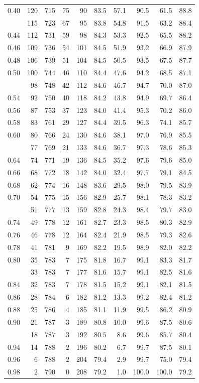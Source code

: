 \documentclass[
  11pt,
  letterpaper,
]{scrbook}
\theoremstyle{definition}
\theoremstyle{remark}
\begin{document}
\begin{longtable}{rrrrrrrrrr}
0.40 & 120 & 715 & 75 & 90 & 83.5 & 57.1 & 90.5 & 61.5 & 88.8\\
\addlinespace
0.42 & 115 & 723 & 67 & 95 & 83.8 & 54.8 & 91.5 & 63.2 & 88.4\\
0.44 & 112 & 731 & 59 & 98 & 84.3 & 53.3 & 92.5 & 65.5 & 88.2\\
0.46 & 109 & 736 & 54 & 101 & 84.5 & 51.9 & 93.2 & 66.9 & 87.9\\
0.48 & 106 & 739 & 51 & 104 & 84.5 & 50.5 & 93.5 & 67.5 & 87.7\\
0.50 & 100 & 744 & 46 & 110 & 84.4 & 47.6 & 94.2 & 68.5 & 87.1\\
\addlinespace
0.52 & 98 & 748 & 42 & 112 & 84.6 & 46.7 & 94.7 & 70.0 & 87.0\\
0.54 & 92 & 750 & 40 & 118 & 84.2 & 43.8 & 94.9 & 69.7 & 86.4\\
0.56 & 87 & 753 & 37 & 123 & 84.0 & 41.4 & 95.3 & 70.2 & 86.0\\
0.58 & 83 & 761 & 29 & 127 & 84.4 & 39.5 & 96.3 & 74.1 & 85.7\\
0.60 & 80 & 766 & 24 & 130 & 84.6 & 38.1 & 97.0 & 76.9 & 85.5\\
\addlinespace
0.62 & 77 & 769 & 21 & 133 & 84.6 & 36.7 & 97.3 & 78.6 & 85.3\\
0.64 & 74 & 771 & 19 & 136 & 84.5 & 35.2 & 97.6 & 79.6 & 85.0\\
0.66 & 68 & 772 & 18 & 142 & 84.0 & 32.4 & 97.7 & 79.1 & 84.5\\
0.68 & 62 & 774 & 16 & 148 & 83.6 & 29.5 & 98.0 & 79.5 & 83.9\\
0.70 & 54 & 775 & 15 & 156 & 82.9 & 25.7 & 98.1 & 78.3 & 83.2\\
\addlinespace
0.72 & 51 & 777 & 13 & 159 & 82.8 & 24.3 & 98.4 & 79.7 & 83.0\\
0.74 & 49 & 778 & 12 & 161 & 82.7 & 23.3 & 98.5 & 80.3 & 82.9\\
0.76 & 46 & 778 & 12 & 164 & 82.4 & 21.9 & 98.5 & 79.3 & 82.6\\
0.78 & 41 & 781 & 9 & 169 & 82.2 & 19.5 & 98.9 & 82.0 & 82.2\\
0.80 & 35 & 783 & 7 & 175 & 81.8 & 16.7 & 99.1 & 83.3 & 81.7\\
\addlinespace
0.82 & 33 & 783 & 7 & 177 & 81.6 & 15.7 & 99.1 & 82.5 & 81.6\\
0.84 & 32 & 783 & 7 & 178 & 81.5 & 15.2 & 99.1 & 82.1 & 81.5\\
0.86 & 28 & 784 & 6 & 182 & 81.2 & 13.3 & 99.2 & 82.4 & 81.2\\
0.88 & 25 & 786 & 4 & 185 & 81.1 & 11.9 & 99.5 & 86.2 & 80.9\\
0.90 & 21 & 787 & 3 & 189 & 80.8 & 10.0 & 99.6 & 87.5 & 80.6\\
\addlinespace
0.92 & 18 & 787 & 3 & 192 & 80.5 & 8.6 & 99.6 & 85.7 & 80.4\\
0.94 & 14 & 788 & 2 & 196 & 80.2 & 6.7 & 99.7 & 87.5 & 80.1\\
0.96 & 6 & 788 & 2 & 204 & 79.4 & 2.9 & 99.7 & 75.0 & 79.4\\
0.98 & 2 & 790 & 0 & 208 & 79.2 & 1.0 & 100.0 & 100.0 & 79.2\\
\bottomrule
\end{longtable}
\end{document}
